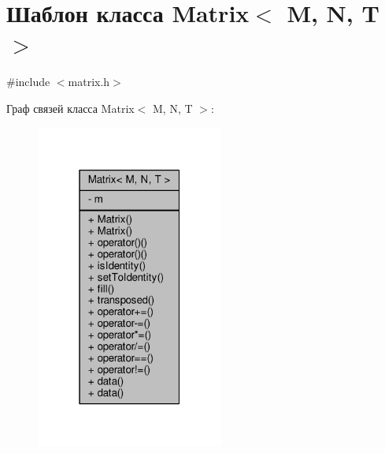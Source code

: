 \hypertarget{class_matrix}{}\section{Шаблон класса Matrix$<$ M, N, T $>$}
\label{class_matrix}


{\ttfamily \#include $<$matrix.\+h$>$}



Граф связей класса Matrix$<$ M, N, T $>$\+:
\nopagebreak
\begin{figure}[H]
\begin{center}
\leavevmode
\includegraphics[width=175pt]{dd/dec/class_matrix__coll__graph}
\end{center}
\end{figure}
